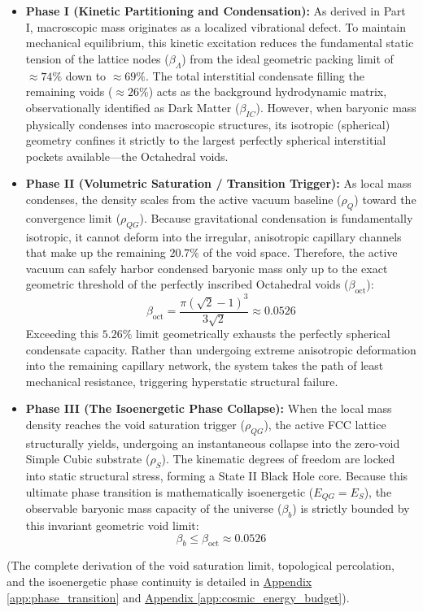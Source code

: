 \begin{itemize}
    \item \textbf{Phase I (Kinetic Partitioning and Condensation):} As derived in Part I, macroscopic mass originates as a localized vibrational defect. To maintain mechanical equilibrium, this kinetic excitation reduces the fundamental static tension of the lattice nodes ($\beta_\Lambda$) from the ideal geometric packing limit of $\approx 74\%$ down to $\approx 69\%$. The total interstitial condensate filling the remaining voids ($\approx 26\%$) acts as the background hydrodynamic matrix, observationally identified as Dark Matter ($\beta_{IC}$). However, when baryonic mass physically condenses into macroscopic structures, its isotropic (spherical) geometry confines it strictly to the largest perfectly spherical interstitial pockets available---the Octahedral voids.
    
    \item \textbf{Phase II (Volumetric Saturation / Transition Trigger):} As local mass condenses, the density scales from the active vacuum baseline ($\rho_Q$) toward the convergence limit ($\rho_{QG}$). Because gravitational condensation is fundamentally isotropic, it cannot deform into the irregular, anisotropic capillary channels that make up the remaining $20.7\%$ of the void space. Therefore, the active vacuum can safely harbor condensed baryonic mass only up to the exact geometric threshold of the perfectly inscribed Octahedral voids ($\beta_{\text{oct}}$):
    \begin{equation}
        \beta_{\text{oct}} = \frac{\pi(\sqrt{2}-1)^3}{3\sqrt{2}} \approx 0.0526
    \end{equation}
    Exceeding this $5.26\%$ limit geometrically exhausts the perfectly spherical condensate capacity. Rather than undergoing extreme anisotropic deformation into the remaining capillary network, the system takes the path of least mechanical resistance, triggering hyperstatic structural failure.
    
    \item \textbf{Phase III (The Isoenergetic Phase Collapse):} When the local mass density reaches the void saturation trigger ($\rho_{QG}$), the active FCC lattice structurally yields, undergoing an instantaneous collapse into the zero-void Simple Cubic substrate ($\rho_S$). The kinematic degrees of freedom are locked into static structural stress, forming a State II Black Hole core. Because this ultimate phase transition is mathematically isoenergetic ($E_{QG} = E_S$), the observable baryonic mass capacity of the universe ($\beta_b$) is strictly bounded by this invariant geometric void limit:
    \begin{equation}
        \beta_b \le \beta_{\text{oct}} \approx 0.0526
    \end{equation}
\end{itemize}

(The complete derivation of the void saturation limit, topological percolation, and the isoenergetic phase continuity is detailed in \hyperref[app:phase_transition]{Appendix \ref*{app:phase_transition}} and \hyperref[app:cosmic_energy_budget]{Appendix \ref*{app:cosmic_energy_budget}}).
